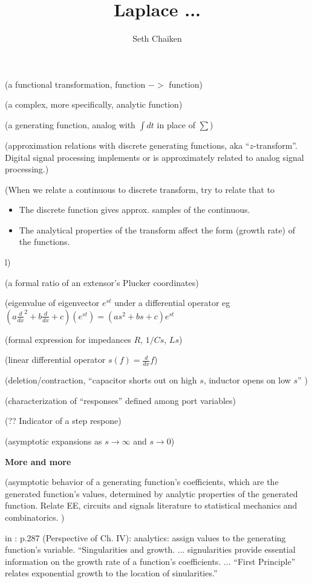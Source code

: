 \documentclass{article}
\title{Laplace ... }
\author{Seth Chaiken}
\begin{document}
\maketitle

(a functional transformation, function $->$ function)

(a complex, more specifically, analytic function)

(a generating function, analog with $\int dt$ in place of $\sum$)

(approximation relations with discrete generating functions, 
aka ``$z$-transform''. Digital signal processing implements or
is approximately related to analog signal processing.)

(When we relate a continuous to discrete transform, try to relate that to
\begin{itemize}
\item The discrete function gives approx. samples of the continuous.
\item The analytical properties of the transform affect the form 
(growth rate) of the functions.
\end{itemize}
l)

(a formal ratio of an extensor's Plucker coordinates)

(eigenvalue of eigenvector $e^{s t}$ under a differential operator eg 
$(a\frac{d}{dx}^2 + b\frac{d}{dx} + c)(e^{st}) = (as^2 +bs + c)e^{st}$

(formal expression for impedances $R$, $1/Cs$, $Ls$)

(linear differential operator $s(f) = \frac{d}{dx}f$)

(deletion/contraction, 
``capacitor shorts out on high $s$, inductor opens on low $s$'' 
\cite{intuitAna})

(characterization of ``responses'' defined among port variables)

(?? Indicator of a step respone)

(asymptotic expansions as $s\rightarrow\infty$
and $s\rightarrow 0$)

\noindent\textbf{More and more}

(asymptotic behavior of a generating function's coefficients, which are
the generated function's values, determined by analytic properties of the
generated function.  Relate EE, circuits and signals literature to 
statistical mechanics and combinatorics.  
\cite{statMechForGraphers,multivarHalfPlane,AnalyticCombinatoricsBook})

in \cite{AnalyticCombinatoricsBook}: p.287 (Perspective of Ch. IV):
analytics: assign values to the generating function's variable.
``Singularities and growth. ... signularities provide essential information 
on the growth rate of a function's coefficients.  ... ``First Principle''
relates 
exponential growth to the location of sinularities.''
\end{document}
